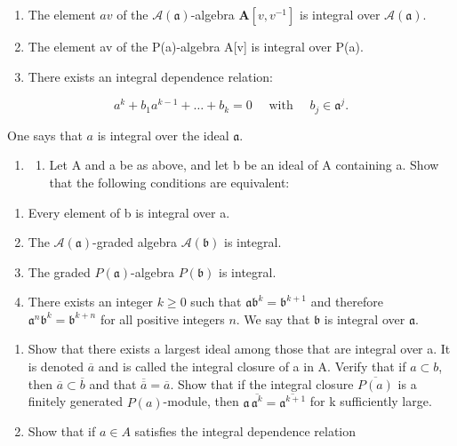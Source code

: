 \begin{enumerate}
\def\labelenumi{(\roman{enumi})}
\item
  The element \(av\) of the \(\mathcal{A}(\mathfrak{a})\)-algebra \(\mathbf{A}[v, v^{-1}]\) is integral over \(\mathcal{A}(\mathfrak{a})\).
\item
  The element av of the P(a)-algebra A{[}v{]} is integral over P(a).
\item
  There exists an integral dependence relation:
\end{enumerate}

\[
a ^ {k} + b _ {1} a ^ {k - 1} + \dots + b _ {k} = 0 \quad \text { with } \quad b _ {j} \in \mathfrak {a} ^ {j}.
\]

One says that \(a\) is integral over the ideal \(\mathfrak{a}\).

\begin{enumerate}
\def\labelenumi{\arabic{enumi})}
\setcounter{enumi}{8}
\tightlist
\item
  \begin{enumerate}
  \def\labelenumii{\alph{enumii})}
  \tightlist
  \item
    Let A and a be as above, and let b be an ideal of A containing a. Show that the following conditions are equivalent:
  \end{enumerate}
\end{enumerate}

\begin{enumerate}
\def\labelenumi{(\roman{enumi})}
\item
  Every element of b is integral over a.
\item
  The \(\mathcal{A}(\mathfrak{a})\)-graded algebra \(\mathcal{A}(\mathfrak{b})\) is integral.
\item
  The graded \(P(\mathfrak{a})\)-algebra \(P(\mathfrak{b})\) is integral.
\item
  There exists an integer \(k \geqslant 0\) such that \(\mathfrak{a}\mathfrak{b}^{k} = \mathfrak{b}^{k+1}\) and therefore \(\mathfrak{a}^{n}\mathfrak{b}^{k} = \mathfrak{b}^{k+n}\) for all positive integers \(n\). We say that \(\mathfrak{b}\) is integral over \(\mathfrak{a}\).
\end{enumerate}

\begin{enumerate}
\def\labelenumi{\alph{enumi})}
\setcounter{enumi}{1}
\item
  Show that there exists a largest ideal among those that are integral over a. It is denoted \(\overline{a}\) and is called the integral closure of a in A. Verify that if \(a \subset b\), then \(\overline{a} \subset \overline{b}\) and that \(\overline{\overline{a}} = \overline{a}\). Show that if the integral closure \(\overline{P(a)}\) is a finitely generated \(P(a)\)-module, then \(\mathfrak{a}\,\overline{\mathfrak{a}^{k}} = \overline{\mathfrak{a}^{k+1}}\) for k sufficiently large.
\item
  Show that if \(a \in A\) satisfies the integral dependence relation
\end{enumerate}

